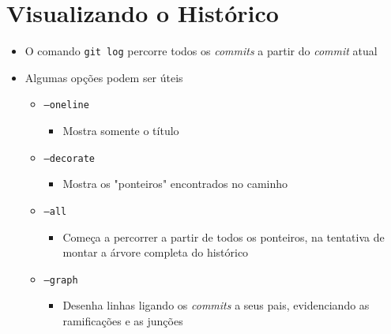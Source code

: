 \documentclass{beamer}
\newenvironment{slide}{\begin{frame}{\insertsection}}{\end{frame}}
\begin{document}
\section{Visualizando o Histórico}
\begin{slide}
    \begin{itemize}
        \item O comando \texttt{git log} percorre todos os \emph{commits} a
            partir do \emph{commit} atual
        \pause
        \item Algumas opções podem ser úteis
        \begin{itemize}
            \pause
            \item \texttt{--oneline}
            \begin{itemize}
                \item Mostra somente o título
            \end{itemize}
            \pause
            \item \texttt{--decorate}
            \begin{itemize}
                \item Mostra os "ponteiros" encontrados no caminho
            \end{itemize}
            \pause
            \item \texttt{--all}
            \begin{itemize}
                \item Começa a percorrer a partir de todos os ponteiros, na
                    tentativa de montar a árvore completa do histórico
            \end{itemize}
            \pause
            \item \texttt{--graph}
            \begin{itemize}
                \item Desenha linhas ligando os \emph{commits} a seus pais,
                    evidenciando as ramificações e as junções
            \end{itemize}
        \end{itemize}
    \end{itemize}
\end{slide}
\end{document}
